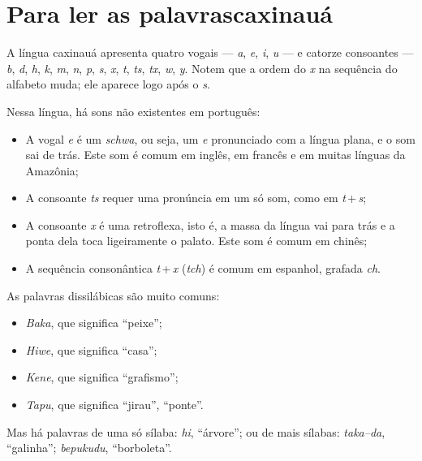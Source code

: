 \chapter[Para ler as palavras caxinauá]{Para ler as palavras\break caxinauá}

A língua caxinauá apresenta quatro vogais --- \textit{a}, \textit{e}, \textit{i}, \textit{u} --- e catorze consoantes --- \textit{b}, \textit{d}, \textit{h}, \textit{k}, \textit{m}, \textit{n}, \textit{p}, \textit{s}, \textit{x}, \textit{t}, \textit{ts}, \textit{tx}, \textit{w}, \textit{y}. Notem que a ordem do \textit{x} na sequência do alfabeto muda;
ele aparece logo após o \textit{s}.

\bigskip

\noindent{}Nessa língua, há sons não existentes em português:

\begin{itemize}
\item A vogal \textit{e} é um \textit{schwa}, ou seja, um \textit{e} pronunciado com a língua plana, e o som sai de trás. Este som é comum em inglês, em francês e em muitas línguas da Amazônia;

\item A consoante \textit{ts} requer uma pronúncia em um só som, como em \textit{t}\,+\,\textit{s};

\item A consoante \textit{x} é uma retroflexa, isto é, a massa da língua vai para trás e a ponta dela toca ligeiramente o palato. Este som é comum em chinês;

\item A sequência consonântica \textit{t}\,+\,\textit{x} (\textit{tch}) é comum em espanhol, grafada \textit{ch}.
\end{itemize}

\noindent{}As palavras dissilábicas são muito comuns:

\begin{itemize}
\item \textit{Baka}, que significa ``peixe'';
\item \textit{Hiwe}, que significa ``casa'';
\item \textit{Kene}, que significa ``grafismo'';
\item \textit{Tapu}, que significa ``jirau'', ``ponte''.
\end{itemize}

\noindent{}Mas há palavras de uma só sílaba: \textit{hi}, ``árvore''; ou de mais sílabas: \textit{taka--da}, ``galinha''; \textit{bepukudu}, ``borboleta''.


